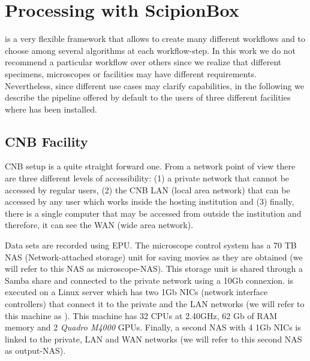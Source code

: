 \section{Processing with ScipionBox}


\scipion is a very flexible framework that allows to create many different workflows and to choose among several algorithms at each workflow-step. In this work we do not recommend a particular workflow 
over others since we realize that different specimens, microscopes or facilities may have different requirements. Nevertheless, since different use cases may clarify \scipionbox capabilities, in the following we describe the pipeline offered by default to the users of three different facilities where \scipion has been installed.

\subsection{CNB Facility}

CNB setup is a quite straight forward one. From a network point of view there are three different levels of accessibility: (1) a private network that cannot be accessed by regular users, (2) the CNB LAN (local area network)  that can be accessed by any user which works inside the hosting  institution and (3) finally, there is a single computer that may be accessed from outside the institution and therefore, it can see the WAN (wide area network).

Data sets are recorded using EPU. The microscope control system has a 70 TB NAS (Network-attached storage) unit for saving movies as they are obtained (we will refer to this NAS as microscope-NAS). This storage unit is shared through a Samba share and connected to the private network using a 10Gb connexion. \scipion is executed on a Linux server which has two 1Gb NICs (network interface controllers) that connect it to the private and the LAN networks (we will refer to this machine as \scipionbox). This machine has 32 CPUs at 2.40GHz, 62 Gb of RAM memory and 2 \textit{Quadro M4000} GPUs. Finally, a second NAS with 4 1Gb NICs is linked to the private, LAN and WAN networks (we will refer to this second NAS as output-NAS).

